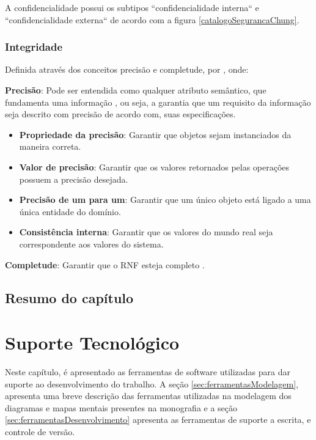 A confidencialidade possui os subtipos ``confidencialidade interna`` e ``confidencialidade externa`` de acordo com a figura \ref{catalogoSegurancaChung}.
 

\subsection{Integridade}
 
Definida através dos conceitos precisão e completude, por \cite{chung2012non}, onde: 

\textbf{Precisão}: Pode ser entendida como qualquer atributo semântico, que fundamenta uma informação \cite{chung2012non}, ou seja, a garantia que um requisito da informação seja descrito com precisão de acordo com, suas especificações. 

\begin{itemize}
	\item \textbf{Propriedade da precisão}: Garantir que objetos sejam instanciados da maneira correta. 
	
	\item \textbf{Valor de precisão}: Garantir que os valores retornados pelas operações possuem a precisão desejada.
	
	\item \textbf{Precisão de um para um}: Garantir que um único objeto está ligado a uma única entidade do domínio. 
	
	\item \textbf{Consistência interna}: Garantir que os valores do mundo real seja correspondente aos valores do sistema.
\end{itemize}

\textbf{Completude}: Garantir que o RNF esteja completo \cite{chung2012non}. 

\section{Resumo do capítulo}


\chapter{Suporte Tecnológico}

Neste capítulo, é apresentado as ferramentas de software utilizadas para dar suporte ao desenvolvimento do trabalho. A seção \ref{sec:ferramentasModelagem}, apresenta uma breve descrição das ferramentas utilizadas na modelagem dos diagramas e mapas mentais presentes na monografia e a seção \ref{sec:ferramentasDesenvolvimento} apresenta as ferramentas de suporte a escrita, e controle de versão. 

